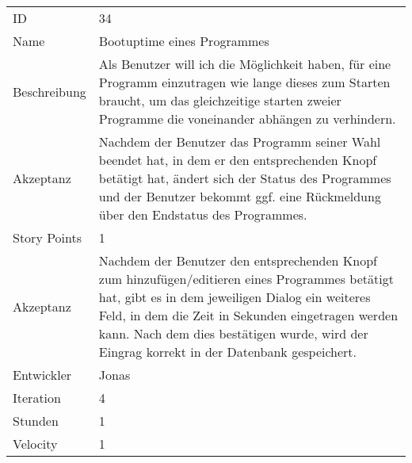 \begin{table}[htbp]
\begin{minipage}{\linewidth}
\setlength{\tymax}{0.5\linewidth}
\centering
\small
\begin{tabulary}{\textwidth}{|l| p{10cm}|} \toprule
 ID   &34\\


Name  &Bootuptime eines Programmes\\
Beschreibung&Als Benutzer will ich die Möglichkeit haben, für eine Programm einzutragen wie lange dieses zum Starten braucht, um das gleichzeitige starten zweier Programme die voneinander abhängen zu verhindern.\\
Akzeptanz &Nachdem der Benutzer das Programm seiner Wahl beendet hat, in dem er den entsprechenden Knopf betätigt hat, ändert sich der Status des Programmes und der Benutzer bekommt ggf. eine Rückmeldung über den Endstatus des Programmes.\\
Story Points&1\\
Akzeptanz &Nachdem der Benutzer den entsprechenden Knopf zum hinzufügen\slash editieren eines Programmes betätigt hat, gibt es in dem jeweiligen Dialog ein weiteres Feld, in dem die Zeit in Sekunden eingetragen werden kann. Nach dem dies bestätigen wurde, wird der Eingrag korrekt in der Datenbank gespeichert.\\
Entwickler &Jonas\\
Iteration &4\\
Stunden  &1\\
Velocity &1\\
\bottomrule

\end{tabulary}
\end{minipage}
\end{table}



